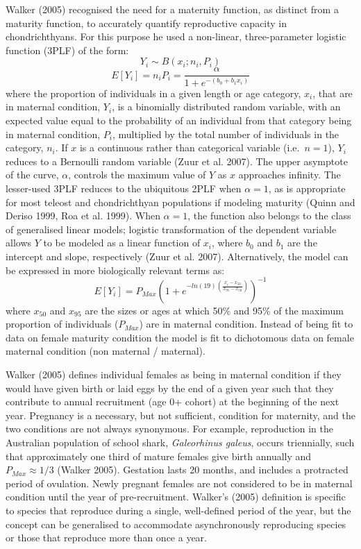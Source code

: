 \documentclass[
]{article}
\begin{document}
Walker (2005) recognised the need for a maternity function, as distinct from a maturity function, to accurately quantify reproductive capacity in chondrichthyans. For this purpose he used a non-linear, three-parameter logistic function (3PLF) of the form: \[Y_i \sim B(x_i; n_i, P_i)\] \[E[Y_i] = n_iP_i = \frac{\alpha}{1 + e^{-(b_0 + b_1x_i)}}\] where the proportion of individuals in a given length or age category, \(x_i\), that are in maternal condition, \(Y_i\), is a binomially distributed random variable, with an expected value equal to the probability of an individual from that category being in maternal condition, \(P_i\), multiplied by the total number of individuals in the category, \(n_i\). If \(x\) is a continuous rather than categorical variable (i.e.~\(n = 1\)), \(Y_i\) reduces to a Bernoulli random variable (Zuur et al. 2007). The upper asymptote of the curve, \(\alpha\), controls the maximum value of \(Y\) as \(x\) approaches infinity. The lesser-used 3PLF reduces to the ubiquitous 2PLF when \(\alpha = 1\), as is appropriate for most teleost and chondrichthyan populations if modeling maturity (Quinn and Deriso 1999, Roa et al. 1999). When \(\alpha = 1\), the function also belongs to the class of generalised linear models; logistic transformation of the dependent variable allows \(Y\) to be modeled as a linear function of \(x_i\), where \(b_0\) and \(b_1\) are the intercept and slope, respectively (Zuur et al. 2007). Alternatively, the model can be expressed in more biologically relevant terms as: \[E[Y_i] = P_{Max} \left ( 1 + e^{-ln(19)\left ( \frac{x_i - x_{50}}{x_{95} - x_{50}} \right )}  \right )^{-1} \] where \(x_{50}\) and \(x_{95}\) are the sizes or ages at which 50\% and 95\% of the maximum proportion of individuals (\(P_{Max}\)) are in maternal condition. Instead of being fit to data on female maturity condition the model is fit to dichotomous data on female maternal condition (non maternal / maternal).

Walker (2005) defines individual females as being in maternal condition if they would have given birth or laid eggs by the end of a given year such that they contribute to annual recruitment (age 0+ cohort) at the beginning of the next year. Pregnancy is a necessary, but not sufficient, condition for maternity, and the two conditions are not always synonymous. For example, reproduction in the Australian population of school shark, \emph{Galeorhinus galeus}, occurs triennially, such that approximately one third of mature females give birth annually and \(P_{Max} \approx 1/3\) (Walker 2005). Gestation lasts 20 months, and includes a protracted period of ovulation. Newly pregnant females are not considered to be in maternal condition until the year of pre-recruitment. Walker's (2005) definition is specific to species that reproduce during a single, well-defined period of the year, but the concept can be generalised to accommodate asynchronously reproducing species or those that reproduce more than once a year.
\end{document}
